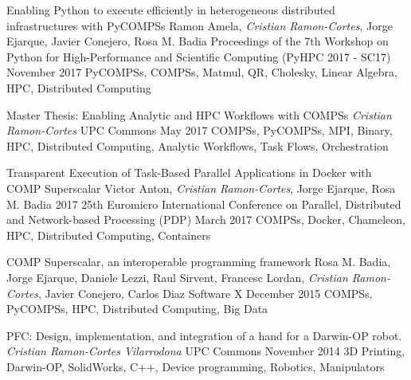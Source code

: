 \begin{publications}
    \publication
        {Enabling Python to execute efficiently in heterogeneous distributed infrastructures with PyCOMPSs}
        {Ramon Amela, \textit{Cristian Ramon-Cortes}, Jorge Ejarque, Javier Conejero, Rosa M. Badia}
        {Proceedings of the 7th Workshop on Python for High-Performance and Scientific Computing (PyHPC 2017 - SC17)}
        {November 2017}
        {PyCOMPSs, COMPSs, Matmul, QR, Cholesky, Linear Algebra, HPC, Distributed Computing}
        {}
        
    \publication
        {Master Thesis: Enabling Analytic and HPC Workflows with COMPSs}
        {\textit{Cristian Ramon-Cortes}}
        {UPC Commons}
        {May 2017}
        {COMPSs, PyCOMPSs, MPI, Binary, HPC, Distributed Computing, Analytic Workflows, Task Flows, Orchestration}
        {}
        
    \publication
        {Transparent Execution of Task-Based Parallel Applications in Docker with COMP Superscalar}
        {Victor Anton, \textit{Cristian Ramon-Cortes}, Jorge Ejarque, Rosa M. Badia}
        {2017 25th Euromicro International Conference on Parallel, Distributed and Network-based Processing (PDP)}
        {March 2017}
        {COMPSs, Docker, Chameleon, HPC, Distributed Computing, Containers}
        {}
        
    \publication
        {COMP Superscalar, an interoperable programming framework}
        {Rosa M. Badia, Jorge Ejarque, Daniele Lezzi, Raul Sirvent, Francesc Lordan, \textit{Cristian Ramon-Cortes}, Javier Conejero, Carlos Diaz}
        {Software X}
        {December 2015}
        {COMPSs, PyCOMPSs, HPC, Distributed Computing, Big Data}
        {}
        
    \publication
        {PFC: Design, implementation, and integration of a hand for a Darwin-OP robot.}
        {\textit{Cristian Ramon-Cortes Vilarrodona}}
        {UPC Commons}
        {November 2014}
        {3D Printing, Darwin-OP, SolidWorks, C++, Device programming, Robotics, Manipulators}
        {}
    
\end{publications}
